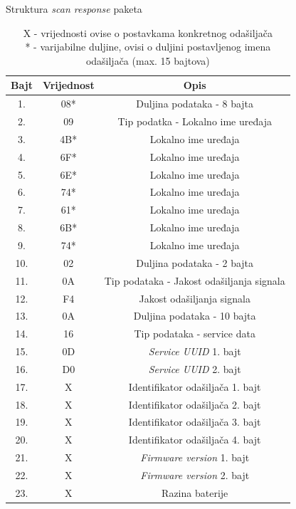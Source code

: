 \begin{table}[H]
    \centering
    \caption{Struktura \textit{scan response} paketa}
    \label{tbl:scanResponse}
    \begin{tabular}{ccc}
    \hline 
    Bajt & Vrijednost & Opis \\ 
    \hline 
    1. & 08* & Duljina podataka - 8 bajta \\ 
    2. & 09 & Tip podatka - Lokalno ime uređaja \\ 
    3. & 4B* & Lokalno ime uređaja \\ 
    4. & 6F* & Lokalno ime uređaja \\ 
    5. & 6E* & Lokalno ime uređaja \\ 
    6. & 74* & Lokalno ime uređaja \\ 
    7. & 61* & Lokalno ime uređaja \\ 
    8. & 6B* & Lokalno ime uređaja \\ 
    9. & 74* & Lokalno ime uređaja \\ 
    10. & 02 & Duljina podataka - 2 bajta \\ 
    11. & 0A & Tip podataka - Jakost odašiljanja signala \\ 
    12. & F4 & Jakost odašiljanja signala \\ 
    13. & 0A & Duljina podataka - 10 bajta \\ 
    14. & 16 & Tip podataka - service data \\ 
    15. & 0D & \textit{Service UUID} 1. bajt \\ 
    16. & D0 & \textit{Service UUID} 2. bajt \\ 
    17. & X & Identifikator odašiljača 1. bajt \\ 
    18. & X & Identifikator odašiljača 2. bajt \\ 
    19. & X & Identifikator odašiljača 3. bajt \\ 
    20. & X & Identifikator odašiljača 4. bajt \\ 
    21. & X & \textit{Firmware version} 1. bajt \\ 
    22. & X & \textit{Firmware version} 2. bajt \\ 
    23. & X & Razina baterije \\ 
    \hline
    \end{tabular}
    \caption*{
        X - vrijednosti ovise o postavkama konkretnog odašiljača \\
        * - varijabilne duljine, ovisi o duljini postavljenog imena odašiljača (max. 15 bajtova)
    } 
\end{table}